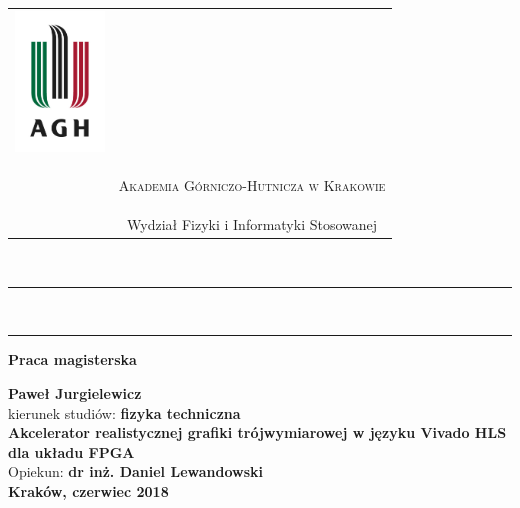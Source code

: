 \documentclass[a4paper, 12pt, twoside]{book}
\numberwithin{equation}{section}
\begin{document}
\begin{table}[H]
\resizebox{\textwidth}{!} {
\begin{tabular}{cc}
\multirow{2}{*}{\includegraphics[height=37.5mm]{img/agh.jpg}} & 
\phantom{tmp} \\ 
& \phantom{tmp} \\

& {
\begin{small}
\textsc{Akademia Górniczo-Hutnicza w Krakowie}
\end{small}} \\ 
& {\small{Wydział Fizyki i Informatyki Stosowanej}}
\end{tabular}
}
\end{table}
~\\ %
\rule{\textwidth}{3pt}\\
\rule[2ex]
\textwidth{1pt}\\
\vspace{7ex}
\begin{center}
{\bf\LARGE{Praca magisterska}}\\
\vspace{13ex}




{\bf\Large{Paweł Jurgielewicz}}\\
\vspace{3ex}
{ \small kierunek studiów:} {\bf\normalsize{fizyka techniczna}}\\
\vspace{10ex}
{\bf\large{
Akcelerator realistycznej grafiki trójwymiarowej w języku Vivado HLS dla układu FPGA
}}\\
\vspace{14ex}
{ \Large {Opiekun:}} {\bf\Large{dr inż. Daniel Lewandowski}}\\
\vspace{18ex}
\bf\large{Kraków, czerwiec 2018}
\end{center}
\newpage
\thispagestyle{empty}
\end{document}
